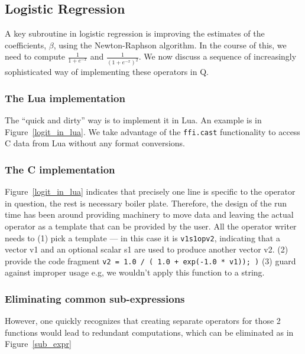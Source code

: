 \subsection{Logistic Regression}

A key subroutine in logistic regression \cite{Hastie2009} is improving the 
estimates of the
coefficients, \(\beta\), using the Newton-Raphson algorithm.
In the course of this, we need to compute
\(\frac{1}{1 + e^{-x}}\) and 
\(\frac{1}{(1 + e^{-x})^2}\).
We now discuss a sequence of increasingly sophisticated way of implementing
these operators in Q.

\subsubsection{The Lua implementation}
The ``quick and dirty'' way is to implement it in Lua. An example is 
in Figure~\ref{logit_in_lua}. We take advantage of the {\tt ffi.cast}
functionality to access C data from Lua without any format conversions.
\begin{figure}
\centering
{}
\end{figure}

\subsubsection{The C implementation}
Figure~\ref{logit_in_lua} indicates that precisely one line is specific to the
operator in question, the rest is necessary boiler plate. Therefore, the design
of the run time has been around providing machinery to move data and leaving
the actual operator as a template that can be provided by the user. All the operator
writer needs to (1) pick a template --- in this case it is {\tt v1s1opv2}, indicating that a
vector v1 and an optional scalar s1 are used to produce another vector v2.
(2) provide the code fragment {\tt  v2 = 1.0 / ( 1.0 + exp(-1.0 * v1)); )} (3)
guard against improper usage e.g, we wouldn't apply this function to a string.


\subsubsection{Eliminating common sub-expressions}
However, one quickly recognizes that creating separate operators for those 2
functions would lead to 
redundant computations, which can be eliminated as in Figure~\ref{sub_expr}

